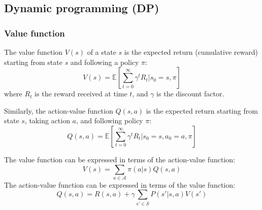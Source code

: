 \subsection{Dynamic programming (DP)}

\subsubsection{Value function}

The value function \( V(s) \) of a state \( s \) is the expected return (cumulative reward) starting from state \( s \) and following a policy \( \pi \):
\begin{equation}
    V(s) = \mathbb{E} \left[ \sum_{t=0}^{\infty} \gamma^t R_t | s_0 = s, \pi \right]
\end{equation}
where \( R_t \) is the reward received at time \( t \), and \( \gamma \) is the discount factor.

Similarly, the action-value function \( Q(s, a) \) is the expected return starting from state \( s \), taking action \( a \), and following policy \( \pi \):
\begin{equation}
    Q(s, a) = \mathbb{E} \left[ \sum_{t=0}^{\infty} \gamma^t R_t | s_0 = s, a_0 = a, \pi \right]
\end{equation}

The value function can be expressed in terms of the action-value function:
\begin{equation}
    V(s) = \sum_{a \in \mathcal{A}} \pi(a | s) Q(s, a)
\end{equation}
The action-value function can be expressed in terms of the value function:
\begin{equation}
    Q(s, a) = R(s, a) + \gamma \sum_{s' \in \mathcal{S}} P(s' | s, a) V(s')
\end{equation}
